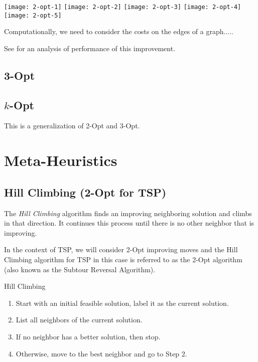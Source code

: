 \begin{center}
\texttt{[image: 2-opt-1]}
\texttt{[image: 2-opt-2]}
\texttt{[image: 2-opt-3]}
\texttt{[image: 2-opt-4]}
\texttt{[image: 2-opt-5]}\footnotemark
\end{center}

Computationally, we need to consider the costs on the edges of a graph.....


See 
\cite{Englert2014} for an analysis of performance of this improvement.
\subsection{3-Opt}


\subsection{$k$-Opt}
This is a generalization of 2-Opt and 3-Opt.

\section{Meta-Heuristics}

\subsection{Hill Climbing (2-Opt for TSP)}
The \emph{Hill Climbing} algorithm finds an improving neighboring solution and climbs in that direction.  It continues this process until there is no other neighbor that is improving.  

In the context of TSP, we will consider 2-Opt improving moves and the Hill Climbing algorithm for TSP in this case is referred to as the 2-Opt algorithm (also known as the Subtour Reversal Algorithm).
\begin{general}{Hill Climbing}{}
\begin{enumerate}
\item Start with an initial feasible solution, label it as the current solution.
\item List all neighbors of the current solution.
\item If no neighbor has a better solution, then stop.
\item Otherwise, move to the best neighbor and go to Step 2.
\end{enumerate}
\end{general}


